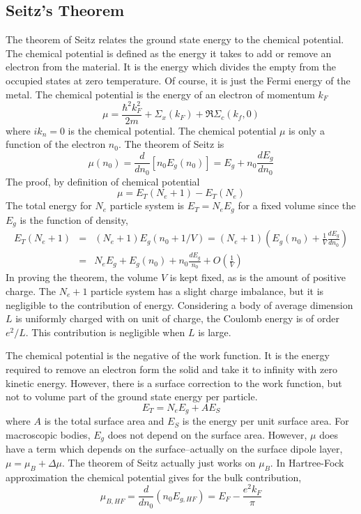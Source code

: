 \subsection{Seitz's Theorem}
The theorem of Seitz relates the ground state energy to the chemical potential.
The chemical potential is defined as the energy it takes to add or remove an electron from the material.
It is the energy which divides the empty from the occupied states at zero temperature.
Of course, it is just the Fermi energy of the metal.
The chemical potential is the energy of an electron of momentum $k_F$
\begin{equation}
    \mu = \frac{\hbar^2 k_F^2}{2m} + \Sigma_x (k_F) + \Re \Sigma_c(k_f,0) \label{5.33}
\end{equation}
where $ik_n= 0$ is the chemical potential.
The chemical potential $\mu$ is only a function of the electron $n_0$. The theorem of Seitz is
\begin{equation}
    \mu (n_0)  = \frac{d}{d n_0}  \left[ n_0 E_g(n_0) \right] = E_g + n_0 \frac{d E_g}{d n_0} \label{5.34}
\end{equation}
The proof, by definition of chemical potential
\begin{equation}
    \mu = E_T(N_e+1) - E_T(N_e)     \label{5.35}
\end{equation}
The total energy for $N_e$ particle system is $E_T = N_e E_g$ for a fixed volume since the $E_g$ is the function of density,
\begin{eqnarray}
    E_T(N_e+1) &=& (N_e+1) E_g(n_0 + 1/V) = (N_e+1) \left( E_g(n_0) + \frac{1}{V} \frac{d E_g}{d n_0} \right) \nonumber \\
    &=& N_e E_g + E_g(n_0) + n_0 \frac{dE_g}{n_0}  + O( \frac{1}{V} )   \label{5.36}
\end{eqnarray}
In proving the theorem, the volume $V$ is kept fixed, as is the amount of positive charge.
The $N_e+1$ particle system has a slight charge imbalance, but it is negligible to the contribution of energy.
Considering a body of average dimension $L$ is uniformly charged with on unit of charge, the Coulomb energy is of order $e^2/L$.
This contribution is negligible when $L$ is large.

The chemical potential is the negative of the work function.
It is the energy required to remove an electron form the solid and take it to infinity with zero kinetic energy.
However, there is a surface correction to the work function, but not to volume part of the ground state energy per particle.
\begin{equation}
    E_T = N_e E_g + A E_S   \label{5.37}
\end{equation}
where $A$ is the total surface area and $E_S$ is the energy per unit surface area.
For macroscopic bodies, $E_g$ does not depend on the surface area.
However, $\mu$ does have a term which depends on the surface--actually on the surface dipole layer, $\mu = \mu_B + \Delta \mu$.
The theorem of Seitz actually just works on $\mu_B$.
In Hartree-Fock approximation the chemical potential gives for the bulk contribution,
\begin{equation}
    \mu_{B,HF} = \frac{d}{dn_0} \left( n_0 E_{g,HF} \right) = E_F - \frac{e^2 k_F}{\pi}     \label{5.39}
\end{equation}

